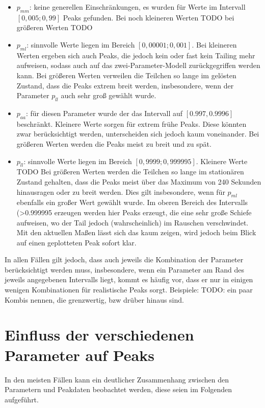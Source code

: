 \begin{itemize}
 \item $p_{mm}$: keine generellen Einschränkungen, es wurden für Werte im Intervall $[0,005; 0,99]$ Peaks gefunden. Bei noch kleineren Werten TODO bei größeren Werten TODO
 \item $p_{ml}$: sinnvolle Werte liegen im Bereich $[0,00001; 0,001]$. Bei kleineren Werten ergeben sich auch Peaks, die jedoch kein oder fast kein Tailing mehr aufweisen, sodass auch auf das zwei-Parameter-Modell zurückgegriffen werden kann. Bei größeren Werten verweilen die Teilchen so lange im gelösten Zustand, dass die Peaks extrem breit werden, insbesondere, wenn der Parameter $p_{ll}$ auch sehr groß gewählt wurde.
 \item $p_{aa}$: für diesen Parameter wurde der das Intervall auf $[0.997, 0.9996]$ beschränkt. Kleinere Werte sorgen für extrem frühe Peaks. Diese könnten zwar berücksichtigt werden, unterscheiden sich jedoch kaum voneinander. Bei größeren Werten werden die Peaks meist zu breit und zu spät. 
 \item $p_{ll}$: sinnvolle Werte liegen im Bereich $[0,9999; 0,999995]$. Kleinere Werte TODO Bei größeren Werten werden die Teilchen so lange im stationären Zustand gehalten, dass die Peaks meist über das Maximum von 240 Sekunden hinausragen oder zu breit werden. Dies gilt insbesondere, wenn für $p_{ml}$ ebenfalls ein großer Wert gewählt wurde. Im oberen Bereich des Intervalls (>0.999995 erzeugen werden hier Peaks erzeugt, die eine sehr große Schiefe aufweisen, wo der Tail jedoch (wahrscheinlich) im Rauschen verschwindet. Mit den aktuellen Maßen lässt sich das kaum zeigen, wird jedoch beim Blick auf einen geplotteten Peak sofort klar.
\end{itemize}

In allen Fällen gilt jedoch, dass auch jeweils die Kombination der Parameter berücksichtigt werden muss, insbesondere, wenn ein Parameter am Rand des jeweils angegebenen Intervalls liegt, kommt es häufig vor, dass er nur in einigen wenigen Kombinationen für realistische Peaks sorgt.
Beispiele: TODO: ein paar Kombis nennen, die grenzwertig, bzw drüber hinaus sind.



\section{Einfluss der verschiedenen Parameter auf Peaks}

In den meisten Fällen kann ein deutlicher Zusammenhang zwischen den Parametern und Peakdaten beobachtet werden, diese seien im Folgenden aufgeführt.

